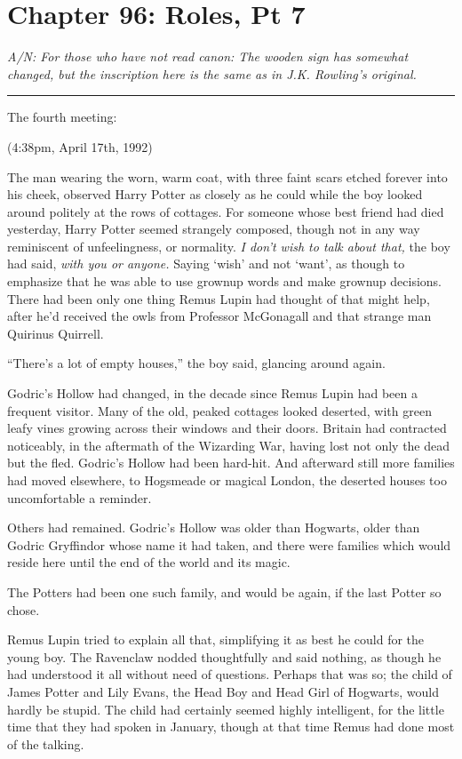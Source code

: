 \chapter{Chapter 96: Roles, Pt 7}
\emph{A/N: For those who have not read canon: The wooden sign has
somewhat changed, but the inscription here is the same as in J.K.
Rowling's original.}

\begin{center}\rule{3in}{0.4pt}\end{center}

The fourth meeting:

(4:38pm, April 17th, 1992)

The man wearing the worn, warm coat, with three faint scars etched
forever into his cheek, observed Harry Potter as closely as he could
while the boy looked around politely at the rows of cottages. For
someone whose best friend had died yesterday, Harry Potter seemed
strangely composed, though not in any way reminiscent of unfeelingness,
or normality. \emph{I don't wish to talk about that,} the boy had said,
\emph{with you or anyone.} Saying `wish' and not `want', as though to
emphasize that he was able to use grownup words and make grownup
decisions. There had been only one thing Remus Lupin had thought of that
might help, after he'd received the owls from Professor McGonagall and
that strange man Quirinus Quirrell.

``There's a lot of empty houses,'' the boy said, glancing around again.

Godric's Hollow had changed, in the decade since Remus Lupin had been a
frequent visitor. Many of the old, peaked cottages looked deserted, with
green leafy vines growing across their windows and their doors. Britain
had contracted noticeably, in the aftermath of the Wizarding War, having
lost not only the dead but the fled. Godric's Hollow had been hard-hit.
And afterward still more families had moved elsewhere, to Hogsmeade or
magical London, the deserted houses too uncomfortable a reminder.

Others had remained. Godric's Hollow was older than Hogwarts, older than
Godric Gryffindor whose name it had taken, and there were families which
would reside here until the end of the world and its magic.

The Potters had been one such family, and would be again, if the last
Potter so chose.

Remus Lupin tried to explain all that, simplifying it as best he could
for the young boy. The Ravenclaw nodded thoughtfully and said nothing,
as though he had understood it all without need of questions. Perhaps
that was so; the child of James Potter and Lily Evans, the Head Boy and
Head Girl of Hogwarts, would hardly be stupid. The child had certainly
seemed highly intelligent, for the little time that they had spoken in
January, though at that time Remus had done most of the talking.

